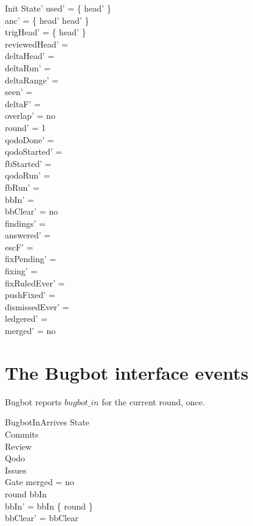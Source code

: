 \documentclass{article}
\begin{document}
\begin{schema}{Init}
  State'
\where
  used' = \{ head' \} \\
  anc' = \{ head' \mapsto head' \} \\
  trigHead' = \{ head' \} \\
  reviewedHead' = \emptyset \\
  deltaHead' = \emptyset \\
  deltaRun' = \emptyset \\
  deltaRange' = \emptyset \\
  seen' = \emptyset \\
  deltaF' = \emptyset \\
  overlap' = no \\
  round' = 1 \\
  qodoDone' = \emptyset \\
  qodoStarted' = \emptyset \\
  fbStarted' = \emptyset \\
  qodoRun' = \emptyset \\
  fbRun' = \emptyset \\
  bbIn' = \emptyset \\
  bbClear' = no \\
  findings' = \emptyset \\
  answered' = \emptyset \\
  escF' = \emptyset \\
  fixPending' = \emptyset \\
  fixing' = \emptyset \\
  fixRuledEver' = \emptyset \\
  pushFixed' = \emptyset \\
  dismissedEver' = \emptyset \\
  ledgered' = \emptyset \\
  merged' = no
\end{schema}

\section{The Bugbot interface events}

Bugbot reports $bugbot\_in$ for the current round, once.

\begin{schema}{BugbotInArrives}
  \Delta State \\
  \Xi Commits \\
  \Xi Review \\
  \Xi Qodo \\
  \Xi Issues \\
  \Xi Gate
\where
  merged = no \\
  round \notin bbIn \\
  bbIn' = bbIn \cup \{ round \} \\
  bbClear' = bbClear
\end{schema}
\end{document}
